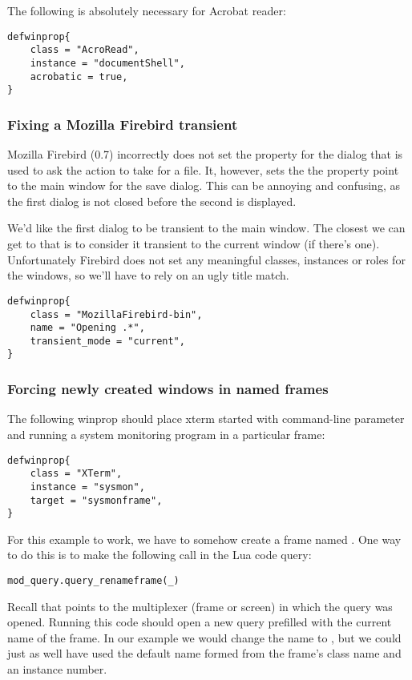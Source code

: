 The following is absolutely necessary for Acrobat reader:

\begin{verbatim}
defwinprop{
    class = "AcroRead",
    instance = "documentShell",
    acrobatic = true,
}
\end{verbatim}

\subsubsection{Fixing a Mozilla Firebird transient}

Mozilla Firebird (0.7) incorrectly does not set the  
property for the dialog that is used to ask the action to take for a file.
It, however, sets the the property point to the main window for the save
dialog. This can be annoying and confusing, as the first dialog is not 
closed before the second is displayed.

We'd like the first dialog to be transient to the main window. The closest
we can get to that is to consider it transient to the current window (if
there's one). Unfortunately Firebird does not set any meaningful classes, 
instances or roles for the windows, so we'll have to rely on an ugly title
match.

\begin{verbatim}
defwinprop{
    class = "MozillaFirebird-bin",
    name = "Opening .*",
    transient_mode = "current",
}
\end{verbatim}

\subsubsection{Forcing newly created windows in named frames}

The following winprop should place xterm started with command-line parameter
\mbox{} and running a system monitoring program in a
particular frame:
\begin{verbatim}
defwinprop{
    class = "XTerm",
    instance = "sysmon",
    target = "sysmonframe",
}
\end{verbatim}

For this example to work, we have to somehow create a frame named
. One way to do this is to make the following
call in the  Lua code query:

\begin{verbatim}
mod_query.query_renameframe(_)
\end{verbatim}

Recall that \code{_} points to the multiplexer (frame or screen) in which 
the query was opened. Running this code should open a new query prefilled
with the current name of the frame. In our example we would change the 
name to , but we could just as well have used the 
default name formed from the frame's class name and an instance number.
